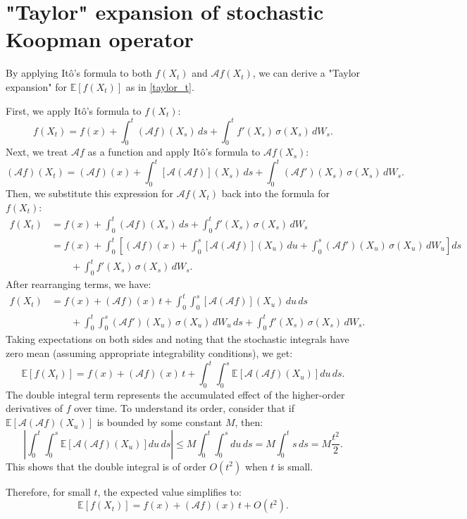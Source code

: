 \documentclass{article}[11]
\begin{document}
\appendix
\newpage
\section{"Taylor" expansion of stochastic Koopman operator}\label{expansion_Ito_formula}
By applying It\^{o}'s formula to both \( f(X_t) \) and \( \mathcal{A} f(X_t) \), we can derive a "Taylor expansion" for \( \mathbb{E}[f(X_t)] \) as in \eqref{taylor_t}. 

First, we apply It\^{o}'s formula to \( f(X_t) \):
\[
f(X_t) = f(x) + \int_0^t (\mathcal{A} f)(X_s)\, ds + \int_0^t f'(X_s)\, \sigma(X_s)\, dW_s.
\]
Next, we treat \( \mathcal{A} f \) as a function and apply It\^{o}'s formula to \( \mathcal{A} f(X_s) \):
\[
(\mathcal{A} f)(X_t) = (\mathcal{A} f)(x) + \int_0^t [\mathcal{A} (\mathcal{A} f)](X_s)\, ds + \int_0^t (\mathcal{A} f')(X_s)\, \sigma(X_s)\, dW_s.
\]
Then, we substitute this expression for \( \mathcal{A} f(X_t) \) back into the formula for \( f(X_t) \):
\[
\begin{aligned}
	f(X_t) &= f(x) + \int_0^t (\mathcal{A} f)(X_s)\, ds + \int_0^t f'(X_s)\, \sigma(X_s)\, dW_s \\
	&= f(x) + \int_0^t \left[ (\mathcal{A} f)(x) + \int_0^s [\mathcal{A} (\mathcal{A} f)](X_u)\, du + \int_0^s (\mathcal{A} f')(X_u)\, \sigma(X_u)\, dW_u \right] ds \\
	&\qquad + \int_0^t f'(X_s)\, \sigma(X_s)\, dW_s.
\end{aligned}
\]
After rearranging terms, we have:
\[
\begin{aligned}
	f(X_t) &= f(x) + (\mathcal{A} f)(x)\, t + \int_0^t \int_0^s [\mathcal{A} (\mathcal{A} f)](X_u)\, du\, ds \\
	&\qquad + \int_0^t \int_0^s (\mathcal{A} f')(X_u)\, \sigma(X_u)\, dW_u\, ds + \int_0^t f'(X_s)\, \sigma(X_s)\, dW_s.
\end{aligned}
\]
Taking expectations on both sides and noting that the stochastic integrals have zero mean (assuming appropriate integrability conditions), we get:
\[
\mathbb{E}[f(X_t)] = f(x) + (\mathcal{A} f)(x)\, t + \int_0^t \int_0^s \mathbb{E}\left[ \mathcal{A} (\mathcal{A} f)(X_u) \right] du\, ds.
\]
The double integral term represents the accumulated effect of the higher-order derivatives of \( f \) over time. To understand its order, consider that if \( \mathbb{E}\left[ \mathcal{A} (\mathcal{A} f)(X_u) \right] \) is bounded by some constant \( M \), then:
\[
\left| \int_0^t \int_0^s \mathbb{E}\left[ \mathcal{A} (\mathcal{A} f)(X_u) \right] du\, ds \right| \leq M \int_0^t \int_0^s du\, ds = M \int_0^t s\, ds = M \frac{t^2}{2}.
\]
This shows that the double integral is of order \( O(t^2) \) when \( t \) is small.

Therefore, for small \( t \), the expected value simplifies to:
\begin{equation}\label{expansion_ot2}
	\mathbb{E}[f(X_t)] = f(x) + (\mathcal{A} f)(x)\, t + O(t^2).
\end{equation}
\end{document}

